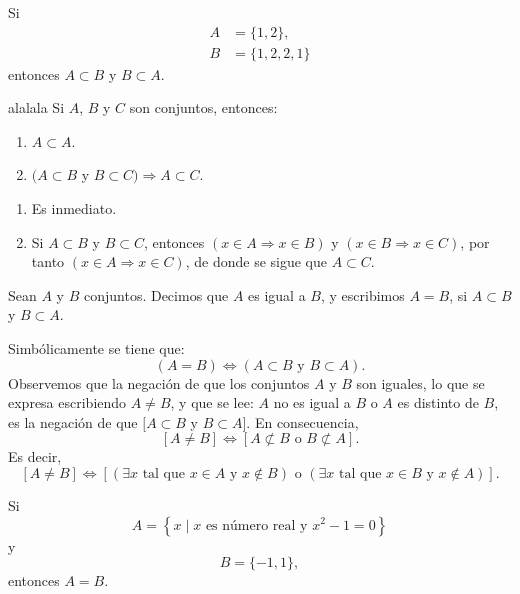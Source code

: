 \begin{examplebox}{}{}
    Si
    \begin{align*}
        A & = \{1, 2\}, \\
        B & = \{1, 2, 2, 1\}
    \end{align*}
    entonces $A \subset B$ y $B \subset A$.
\end{examplebox}

\begin{prop}{}{alalala}
    Si $A$, $B$ y $C$ son conjuntos, entonces:
    \begin{enumerate}[label=\roman*., topsep=6pt, itemsep=0pt]
        \item $A \subset A$.
        \item $(A \subset B$ y $B \subset C) \Longrightarrow A \subset C$.
    \end{enumerate}
    \tcblower
    \demostracion
    \begin{enumerate}[label=\roman*., topsep=6pt, itemsep=0pt]
        \item Es inmediato.
        \item Si $A \subset B$ y $B \subset C$, entonces $(x \in A \Longrightarrow x \in B)$ y $(x \in B \Longrightarrow x \in C)$, por tanto $(x \in A \Longrightarrow x \in C)$, de donde se sigue que $A \subset C$.
    \end{enumerate}
\end{prop}

\newpage

\begin{definicion}{}{}
    Sean $A$ y $B$ conjuntos. Decimos que $A$ es igual a $B$, y escribimos $A = B$, si $A \subset B$ y $B \subset A$.
\end{definicion}

Simbólicamente se tiene que:
$$(A = B) \Longleftrightarrow (A \subset B \text{ y } B \subset A).$$
Observemos que la negación de que los conjuntos $A$ y $B$ son iguales, lo que se expresa escribiendo $A \neq B$, y que se lee: $A$ no es igual a $B$ o $A$ es distinto de $B$, es la negación de que $[A \subset B$ y $B \subset A]$. En consecuencia,
$$[A \neq B] \Longleftrightarrow[A \not \subset B \text{ o } B \not \subset A].$$
Es decir,
$$[A \neq B] \Longleftrightarrow[(\exists x \text{ tal que } x \in A \text { y } x \notin B) \text { o }(\exists x \text{ tal que } x \in B \text{ y } x \notin A)].$$
\begin{examplebox}{}{}
    Si
    $$A = \left\{ x \mid x \text{ es número real y } x^2 - 1 = 0 \right\}$$
    y
    $$B = \{ -1,  1 \},$$
    entonces $A = B$.
\end{examplebox}

